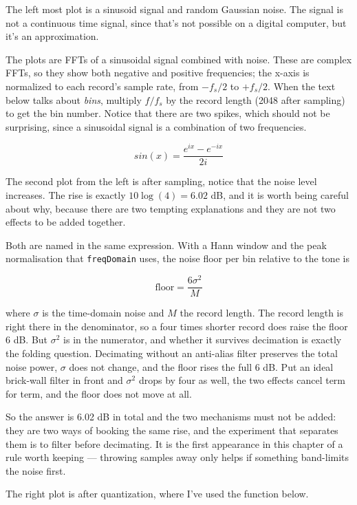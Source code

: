 The left most plot is a sinusoid signal and random Gaussian noise. The
signal is not a continuous time signal, since that's not possible on a
digital computer, but it's an approximation.

The plots are FFTs of a sinusoidal signal combined with noise. These are
complex FFTs, so they show both negative and positive frequencies; the
x-axis is normalized to each record's sample rate, from \(-f_s/2\) to
\(+f_s/2\). When the text below talks about \emph{bins}, multiply
\(f/f_s\) by the record length (2048 after sampling) to get the bin
number. Notice that there are two spikes, which should not be
surprising, since a sinusoidal signal is a combination of two
frequencies.

\[
sin(x) = \frac{e^{ix} - e^{-ix}}{2i}
\]

The second plot from the left is after sampling, notice that the noise
level increases. The rise is exactly \(10\log(4) = 6.02\) dB, and it is
worth being careful about why, because there are two tempting
explanations and they are not two effects to be added together.

Both are named in the same expression. With a Hann window and the peak
normalisation that \texttt{freqDomain} uses, the noise floor per bin
relative to the tone is

\[ \text{floor} = \frac{6\sigma^2}{M} \]

where \(\sigma\) is the time-domain noise and \(M\) the record length.
The record length is right there in the denominator, so a four times
shorter record does raise the floor 6 dB. But \(\sigma^2\) is in the
numerator, and whether it survives decimation is exactly the folding
question. Decimating without an anti-alias filter preserves the total
noise power, \(\sigma\) does not change, and the floor rises the full 6
dB. Put an ideal brick-wall filter in front and \(\sigma^2\) drops by
four as well, the two effects cancel term for term, and the floor does
not move at all.

So the answer is 6.02 dB in total and the two mechanisms must not be
added: they are two ways of booking the same rise, and the experiment
that separates them is to filter before decimating. It is the first
appearance in this chapter of a rule worth keeping --- throwing samples
away only helps if something band-limits the noise first.

The right plot is after quantization, where I've used the function
below.

